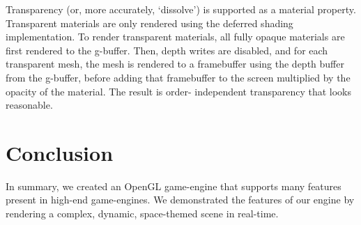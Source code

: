 \documentclass[11pt]{scrartcl} %
\begin{document}
            Transparency (or, more accurately, `dissolve') is supported as a
            material property. Transparent materials are only rendered using
            the deferred shading implementation. To render transparent
            materials, all fully opaque materials are first rendered to the
            g-buffer. Then, depth writes are disabled, and for each transparent
            mesh, the mesh is rendered to a framebuffer using the depth buffer
            from the g-buffer, before adding that framebuffer to the screen
            multiplied by the opacity of the material. The result is order-
            independent transparency that looks reasonable.


\section{Conclusion}

    In summary, we created an OpenGL game-engine that supports many features
    present in high-end game-engines. We demonstrated the features of our
    engine by rendering a complex, dynamic, space-themed scene in real-time.
\end{document}
